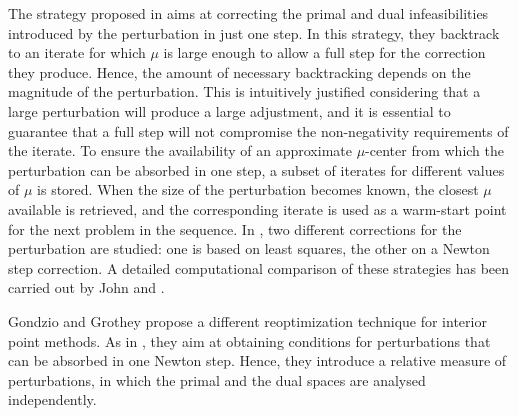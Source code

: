 {The strategy proposed in \cite{YildirimWright} aims at correcting the 
primal and dual infeasibilities introduced by the perturbation in just 
one step.
In this strategy, they backtrack to an iterate for which $\mu$ is 
large enough to allow a full step for the correction they produce. 
Hence, the amount of necessary backtracking depends on the magnitude 
of the perturbation.
This is intuitively justified considering that a large perturbation 
will produce a large adjustment, and it is essential to guarantee that 
a full step will not compromise the non-negativity requirements of the 
iterate.
%
To ensure the availability of an approximate $\mu$-center from which 
the perturbation can be absorbed in one step, a subset of 
iterates for different values of $\mu$ is stored.
When the size of the perturbation becomes known, the closest $\mu$ 
available is retrieved, and the corresponding iterate is used as a 
warm-start point for the next problem in the sequence.
%
In \cite{YildirimWright}, two different corrections for the perturbation
are studied: one is based on least squares, the other on a Newton step 
correction.
A detailed computational comparison of these strategies has been 
carried out by John and \yildirim \cite{JohnYildirim}.

Gondzio and Grothey \cite{GondzioGrothey03} propose a different 
reoptimization technique for interior point methods.
As in \cite{YildirimWright}, they aim at obtaining conditions for 
perturbations that can be absorbed in one Newton step.
Hence, they introduce a relative measure of perturbations, in which 
the primal and the dual spaces are analysed independently.


}
